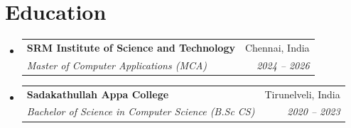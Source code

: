 \documentclass[letterpaper,10pt]{article}
\makeatletter
\newcommand{\resumeSubheading}[4]{
  \vspace{-2pt}\item
    \begin{tabular*}{0.97\textwidth}[t]{l@{\extracolsep{\fill}}r}
      \textbf{#1} & #2 \\
      \textit{\small#3} & \textit{\small #4} \\
    \end{tabular*}\vspace{-6pt}
}
\newcommand{\resumeSubHeadingListStart}{\begin{itemize}[leftmargin=0.15in, label={}]}
\newcommand{\resumeSubHeadingListEnd}{\end{itemize}}
\makeatother
\begin{document}
\section{Education}
  \resumeSubHeadingListStart
    \resumeSubheading
      {SRM Institute of Science and Technology}{Chennai, India}
      {Master of Computer Applications (MCA)}{2024 -- 2026}
    \resumeSubheading
      {Sadakathullah Appa College}{Tirunelveli, India}
      {Bachelor of Science in Computer Science (B.Sc CS)}{2020 -- 2023}
  \resumeSubHeadingListEnd

\end{document}
